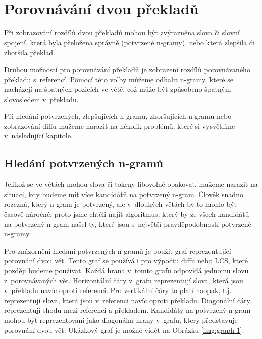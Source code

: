 \chapter{Porovnávání dvou překladů}
\label{chap:compare}

Při zobrazování rozdílů dvou překladů mohou být zvýrazněna slova či slovní spojení,
  která byla přeložena správně (potvrzené \mbox{n-gramy)},
  nebo která zlepšila či zhoršila překlad.

Druhou možností pro porovnávání překladů je zobrazení rozdílů porovnávaného překladu s~referencí.
Pomocí této volby můžeme odhalit \mbox{n-gramy},
  které se nacházejí na špatných pozicích ve větě,
  což může být způsobeno špatným slovosledem v~překladu.

Při hledání potvrzených, zlepšujících \mbox{n-gramů}, zhoršujících \mbox{n-gramů} nebo zobrazování diffu můžeme narazit na několik problémů,
  které si vysvětlíme v~následující kapitole.

\section{Hledání potvrzených \mbox{n-gramů}}
Jelikož se ve větách mohou slova či tokeny libovolně opakovat,
  můžeme narazit na situaci,
  kdy budeme mít více kandidátů na potvrzený \mbox{n-gram}.
Člověk snadno rozezná,
  který \mbox{n-gram} je potvrzený,
  ale v~dlouhých větách by to mohlo být časově náročné,
  proto jsme chtěli najít algoritmus,
  který by ze všech kandidátů na potvrzený \mbox{n-gram} našel ty,
  které jsou s~největší pravděpodobností potvrzené \mbox{n-gramy}.

Pro znázornění hledání potvrzených \mbox{n-gramů} je použit graf reprezentující porovnání dvou vět.
Tento graf se používá i pro výpočtu diffu nebo LCS,
  které později budeme používat.
Každá hrana v~tomto grafu odpovídá jednomu slovu z~porovnávaných vět.
Horizontální čáry v~grafu reprezentují slova, která jsou v~překladu navíc oproti referenci. 
Pro vertikální čáry to platí naopak, t.j. reprezentují slova, která jsou v~referenci navíc oproti překladu.
Diagonální čáry reprezentují shodu mezi referencí a překladem.
Kandidáty na potvrzený \mbox{n-gram} mohou být reprezentováni jako diagonální hrany v~grafu,
  který představuje porovnání dvou vět.
Ukázkový graf je možné vidět na Obrázku \ref{img:graph-1}.


